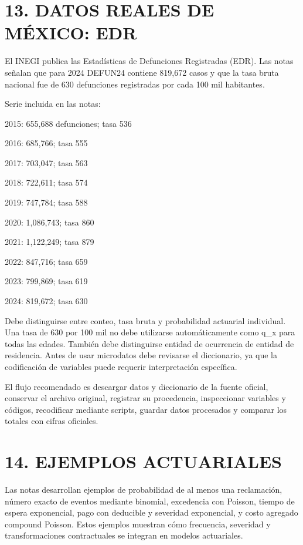 \documentclass[11pt]{article}
\begin{document}
\section*{13. DATOS REALES DE MÉXICO: EDR}

El INEGI publica las Estadísticas de Defunciones Registradas (EDR). Las notas señalan que para 2024 DEFUN24 contiene 819,672 casos y que la tasa bruta nacional fue de 630 defunciones registradas por cada 100 mil habitantes.

Serie incluida en las notas:

2015: 655,688 defunciones; tasa 536

2016: 685,766; tasa 555

2017: 703,047; tasa 563

2018: 722,611; tasa 574

2019: 747,784; tasa 588

2020: 1,086,743; tasa 860

2021: 1,122,249; tasa 879

2022: 847,716; tasa 659

2023: 799,869; tasa 619

2024: 819,672; tasa 630

Debe distinguirse entre conteo, tasa bruta y probabilidad actuarial individual. Una tasa de 630 por 100 mil no debe utilizarse automáticamente como q\_x para todas las edades. También debe distinguirse entidad de ocurrencia de entidad de residencia. Antes de usar microdatos debe revisarse el diccionario, ya que la codificación de variables puede requerir interpretación específica.

El flujo recomendado es descargar datos y diccionario de la fuente oficial, conservar el archivo original, registrar su procedencia, inspeccionar variables y códigos, recodificar mediante scripts, guardar datos procesados y comparar los totales con cifras oficiales.

\section*{14. EJEMPLOS ACTUARIALES}

Las notas desarrollan ejemplos de probabilidad de al menos una reclamación, número exacto de eventos mediante binomial, excedencia con Poisson, tiempo de espera exponencial, pago con deducible y severidad exponencial, y costo agregado compound Poisson. Estos ejemplos muestran cómo frecuencia, severidad y transformaciones contractuales se integran en modelos actuariales.
\end{document}
